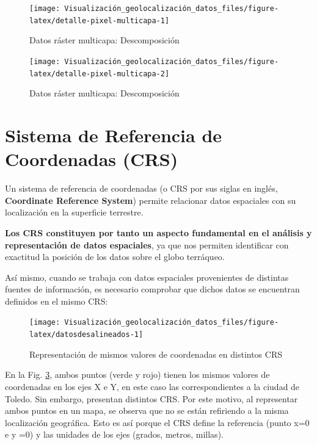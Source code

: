 \documentclass[
]{book}
\theoremstyle{definition}
\theoremstyle{definition}
\theoremstyle{definition}
\theoremstyle{definition}
\theoremstyle{remark}
\begin{document}
\begin{figure}

{\centering \texttt{[image: Visualización\_geolocalización\_datos\_files/figure-latex/detalle-pixel-multicapa-1]} 

}

\caption{Datos ráster multicapa: Descomposición}\label{fig:detalle-pixel-multicapa-1}
\end{figure}
\begin{figure}

{\centering \texttt{[image: Visualización\_geolocalización\_datos\_files/figure-latex/detalle-pixel-multicapa-2]} 

}

\caption{Datos ráster multicapa: Descomposición}\label{fig:detalle-pixel-multicapa-2}
\end{figure}

\hypertarget{CRS}{%
\section{Sistema de Referencia de Coordenadas (CRS)}\label{CRS}}

Un sistema de referencia de coordenadas (o CRS por sus siglas en inglés,
\textbf{Coordinate Reference System}) permite relacionar datos espaciales con su
localización en la superficie terrestre.

\textbf{Los CRS constituyen por tanto un aspecto fundamental en el análisis y
representación de datos espaciales}, ya que nos permiten identificar con
exactitud la posición de los datos sobre el globo terráqueo.

Así mismo, cuando se trabaja con datos espaciales provenientes de distintas
fuentes de información, es necesario comprobar que dichos datos se encuentran
definidos en el mismo CRS:

\begin{figure}

{\centering \texttt{[image: Visualización\_geolocalización\_datos\_files/figure-latex/datosdesalineados-1]} 

}

\caption{Representación de mismos valores de coordenadas en distintos CRS}\label{fig:datosdesalineados}
\end{figure}

En la Fig. \ref{fig:datosdesalineados}, ambos puntos (verde y rojo) tienen los
mismos valores de coordenadas en los ejes X e Y, en este caso las
correspondientes a la ciudad de Toledo. Sin embargo, presentan distintos CRS.
Por este motivo, al representar ambos puntos en un mapa, se observa que no se
están refiriendo a la misma localización geográfica. Esto es así porque el CRS
define la referencia (punto x=0 e y =0) y las unidades de los ejes (grados,
metros, millas).
\end{document}
